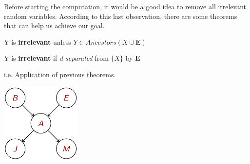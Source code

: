 Before starting the computation, it would be a good idea to remove all irrelevant random variables. According to this last observation,
there are some theorems that can help us achieve our goal.
\begin{definition}[title={Theorem}]
    Y is \textbf{irrelevant} unless $Y \in Ancestors({X} \cup \mathbf{E})$
\end{definition}
\begin{definition}[title={Theorem}]
    Y is \textbf{irrelevant} if \textit{d-separated} from $\{X\}$ by $\mathbf{E}$
\end{definition}
\begin{example}
    i.e. Application of previous theorems. \vspace{3.5pt}
    \begin{center}
        \includegraphics[width=0.3\textwidth]{img/img14.png}
    \end{center} \vspace{3.5pt}


\end{example}

